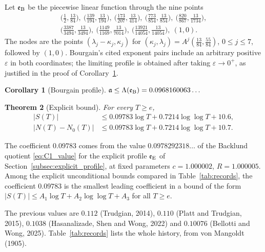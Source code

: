 \documentclass[11pt,a4paper]{article}
\makeatletter
\numberwithin{equation}{section}
\DeclareRobustCommand{\CGref}[1]{\ref{#1}}
\DeclareRobustCommand{\CGeqref}[1]{\eqref{#1}}
\let\CG@origref\ref
\let\CG@origeqref\eqref
\newcommand{\CG@gettip}[1]{\@ifundefined{CGTip@#1}{#1}{\csname CGTip@#1\endcsname}}
\DeclareRobustCommand{\CGref}[1]{\pdftooltip{\CG@origref{#1}}{\CG@gettip{#1}}}
\DeclareRobustCommand{\CGeqref}[1]{\pdftooltip{\CG@origeqref{#1}}{\CG@gettip{#1}}}
\newtheorem{theorem}{Theorem}[section]
\newtheorem{corollary}[theorem]{Corollary}
\theoremstyle{definition}
\theoremstyle{remark}
\newcommand{\Nz}{N_0} %
\newcommand{\eB}{\mathfrak e_{\rm B}}
\newcommand{\eE}{\mathfrak e_{\rm E}}
\makeatother
\begin{document}
Let $\eB$ be the piecewise linear function through the nine points
\begin{equation}
\begin{gathered}
\bigl(\tfrac12,\tfrac{13}{84}\bigr),\ \bigl(\tfrac{139}{194},\tfrac{13}{194}\bigr),\ \bigl(\tfrac{173}{207},\tfrac{13}{414}\bigr),\ \bigl(\tfrac{773}{854},\tfrac{13}{854}\bigr),\ \bigl(\tfrac{820}{867},\tfrac{13}{1734}\bigr),\\ \bigl(\tfrac{3387}{3494},\tfrac{13}{3494}\bigr),\ \bigl(\tfrac{1149}{1169},\tfrac{13}{7014}\bigr),\ \bigl(\tfrac{13921}{14054},\tfrac{13}{14054}\bigr),\ (1,0).
\end{gathered}
\label{eq:bourgain_nodes}
\end{equation}
The nodes are the points $(\lambda_j-\kappa_j,\kappa_j)$ for $(\kappa_j,\lambda_j)=A^j(\frac{13}{84},\frac{55}{84})$, $0\le j\le7$, followed by $(1,0)$. Bourgain's cited exponent pairs include an arbitrary positive $\varepsilon$ in both coordinates; the limiting profile is obtained after taking $\varepsilon\to0^+$, as justified in the proof of Corollary~\CGref{cor:bourgain}.

\begin{corollary}[Bourgain profile]\label{cor:bourgain}
$\displaystyle \mathfrak a\le\Lambda(\eB)=0.0968160063\ldots$
\end{corollary}

\begin{theorem}[Explicit bound]\label{thm:explicit}
For every $T\ge e$,
\begin{align}
|S(T)|&\le0.09783\log T+0.7214\log\log T+10.6,\label{eq:explicit_S}\\
\bigl|N(T)-\Nz(T)\bigr|&\le0.09783\log T+0.7214\log\log T+10.7.\label{eq:explicit_N}
\end{align}
\end{theorem}

The coefficient $0.09783$ comes from the value $0.0978292318\ldots$ of the Backlund quotient \CGeqref{eq:C1_value} for the explicit profile $\eE$ of Section~\CGref{subsec:explicit_profile}, at fixed parameters $c=1.000002$, $R=1.000005$. Among the explicit unconditional bounds compared in Table~\CGref{tab:records}, the coefficient $0.09783$ is the smallest leading coefficient in a bound of the form $|S(T)|\le A_1\log T+A_2\log\log T+A_3$ for all $T\ge e$.

The previous values are $0.112$ (Trudgian, 2014), $0.110$ (Platt and Trudgian, 2015), $0.1038$ (Hasanalizade, Shen and Wong, 2022) and $0.10076$ (Bellotti and Wong, 2025). Table~\CGref{tab:records} lists the whole history, from von Mangoldt (1905).
\end{document}
